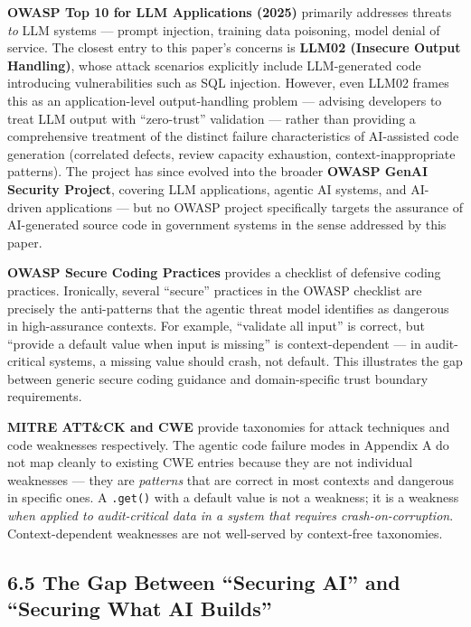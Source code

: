 \documentclass[a4paper,11pt]{report}
\begin{document}
\textbf{OWASP Top 10 for LLM Applications (2025)} primarily addresses
threats \emph{to} LLM systems --- prompt injection, training data
poisoning, model denial of service. The closest entry to this paper's
concerns is \textbf{LLM02 (Insecure Output Handling)}, whose attack
scenarios explicitly include LLM-generated code introducing
vulnerabilities such as SQL injection. However, even LLM02 frames this
as an application-level output-handling problem --- advising developers
to treat LLM output with ``zero-trust'' validation --- rather than
providing a comprehensive treatment of the distinct failure
characteristics of AI-assisted code generation (correlated defects,
review capacity exhaustion, context-inappropriate patterns). The project
has since evolved into the broader \textbf{OWASP GenAI Security
Project}, covering LLM applications, agentic AI systems, and AI-driven
applications --- but no OWASP project specifically targets the assurance
of AI-generated source code in government systems in the sense addressed
by this paper.

\textbf{OWASP Secure Coding Practices} provides a checklist of defensive
coding practices. Ironically, several ``secure'' practices in the OWASP
checklist are precisely the anti-patterns that the agentic threat model
identifies as dangerous in high-assurance contexts. For example,
``validate all input'' is correct, but ``provide a default value when
input is missing'' is context-dependent --- in audit-critical systems, a
missing value should crash, not default. This illustrates the gap
between generic secure coding guidance and domain-specific trust
boundary requirements.

\textbf{MITRE ATT\&CK and CWE} provide taxonomies for attack techniques
and code weaknesses respectively. The agentic code failure modes in
Appendix A do not map cleanly to existing CWE entries because they are
not individual weaknesses --- they are \emph{patterns} that are correct
in most contexts and dangerous in specific ones. A \texttt{.get()} with
a default value is not a weakness; it is a weakness \emph{when applied
to audit-critical data in a system that requires crash-on-corruption}.
Context-dependent weaknesses are not well-served by context-free
taxonomies.

\hypertarget{the-gap-between-securing-ai-and-securing-what-ai-builds}{%
\subsection{6.5 The Gap Between ``Securing AI'' and ``Securing What AI
Builds''}\label{the-gap-between-securing-ai-and-securing-what-ai-builds}}
\end{document}

